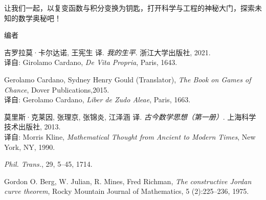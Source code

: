 \documentclass[11pt,a4paper,twoside,openright,scheme=chinese]{ctexbook}
\begin{document}
让我们一起，以复变函数与积分变换为钥匙，打开科学与工程的神秘大门，探索未知的数学奥秘吧！

\vskip 0.5cm
\begin{flushright}
编者\\
\zhtoday
\end{flushright}


\tableofcontents




\mainmatter




% 
% 
% 
% 
% 
% 

% 




\begin{thebibliography}{Car43}

吉罗拉莫·卡尔达诺, 王宪生 译.
{\em 我的生平}.
浙江大学出版社, 2021.\\
译自: 
Girolamo Cardano, {\em De Vita Propria}, Paris, 1643.

Gerolamo Cardano, Sydney Henry Gould (Translator),
{\em The Book on Games of Chance}, Dover Publications,2015.\\
译自: 
Gerolamo Cardano, {\em Liber de Zudo Aleae}, Paris, 1663.


莫里斯·克莱因, 张理京, 张锦炎, 江泽涵 译.
{\em 古今数学思想（第一册）}.
上海科学技术出版社, 2013.\\
译自: 
Morris Kline, {\em Mathematical Thought from Ancient to Modern Times}, New York, NY, 1990.


{\em Phil. Trans.}, 29, 5--45, 1714.

Gordon O. Berg, W. Julian, R. Mines, Fred Richman,
{\em The constructive Jordan curve theorem},
Rocky Mountain Journal of Mathematics, 5 (2):225--236,
1975.

\end{thebibliography}
\end{document}
